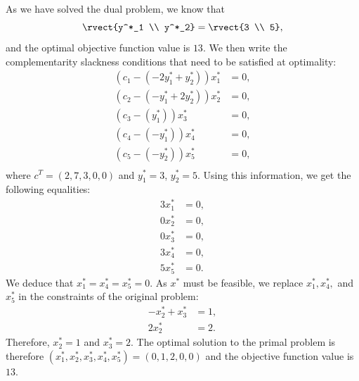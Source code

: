 \begin{enumerate}

%
%

As we have solved the dual problem, we know  that  
 \[
\rvect{y^*_1 \\ y^*_2}= \rvect{3 \\ 5},
\]
and the optimal objective function value is $13$.
We then write the complementarity slackness conditions that need to be satisfied at optimality:
\begin{align*}
(c_1-(-2y_1^*+y_2^*))x_1^* &= 0, \\
(c_2-(-y_1^*+2y_2^*))x_2^* &= 0, \\
(c_3-(y_1^*))x_3^* &= 0, \\
(c_4-(-y_1^*))x_4^* &= 0, \\
(c_5-(-y_2^*))x_5^* &= 0, \\
\end{align*}
where $c^{T} = (2, 7, 3,0,0)$ and $y_1^* = 3$, $y_2^*=5$. Using this information, we get the following equalities:
 \begin{align*}
 3x_1^* &= 0, \\
0x_2^* &= 0, \\
0x_3^* &= 0, \\
 3x_4^* &= 0, \\
5x_5^* &= 0.
 \end{align*}
We deduce that $x_1^* = x_4^* = x_5^* = 0$. As $x^*$ must
be feasible, we replace
 $x_1^*, x_4^*,$ and $x_5^*$ in the constraints of the original problem:
\begin{align*}
-x^*_2+x^*_3 &= 1, \\
2x^*_2 &= 2.
\end{align*}
 Therefore, $x^*_2=1$ and $x^*_3=2$. The optimal solution to the
 primal problem is therefore $(x_1^*,x_2^*,x_3^*,x_4^*,x_5^*)=(0,1,2,0,0)$ and
 the objective function value is $13$.


\end{enumerate}
